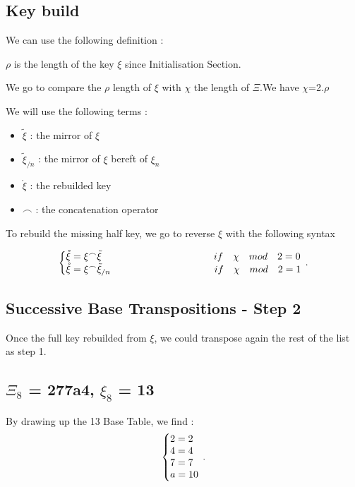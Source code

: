 \documentclass[letterpaper,10pt,english]{sphinxmanual}
\begin{document}
\subsection{Key build}
\begin{flushleft}
We can use the following definition :

$\rho$ is the length of the key $\xi$ since Initialisation Section.

We go to compare the $\rho$ length of $\xi$ with $\chi$ the length of $\Xi$.We have $\chi$=2.$\rho$

We will use the following terms : 

\begin{itemize}
  \item $\tilde{\xi}$ : the mirror of $\xi$
  
  \item $\tilde{\xi}_{/n}$ : the mirror of $\xi$ bereft of $\xi_{n}$
  
  \item $\mathring{\xi}$ : the rebuilded key  
  
  \item $\frown$ : the concatenation operator
\end{itemize}
\end{flushleft}

\begin{flushleft}
To rebuild the missing half key, we go to reverse $\xi$ with the following syntax   
\end{flushleft}

\begin{equation}
\centering
\left\{\begin{array}{@{}l@{}}
\mathring{\xi} = \xi^\frown  \tilde{\xi} \hspace*{4cm} if \quad \chi \quad mod \quad 2 = 0\\
\mathring{\xi} = \xi^\frown  \tilde{\xi}_{/n} \hspace*{3.7cm} if \quad \chi \quad mod \quad 2 = 1
\end{array}\right.\,.
\end{equation}

\subsection{Successive Base Transpositions - Step 2}

Once the full key rebuilded from $\xi$, we could transpose again the rest of the list as step 1.

\subsection{$\Xi_{8}$ = 277a4, $\xi_{8}$ = 13}
By drawing up the 13 Base Table, we find :
\begin{equation}
\centering
\left\{\begin{array}{@{}l@{}}
2=2 \\
4=4 \\
7=7 \\
a=10 \\
\end{array}\right.\,.
\end{equation}
\end{document}
